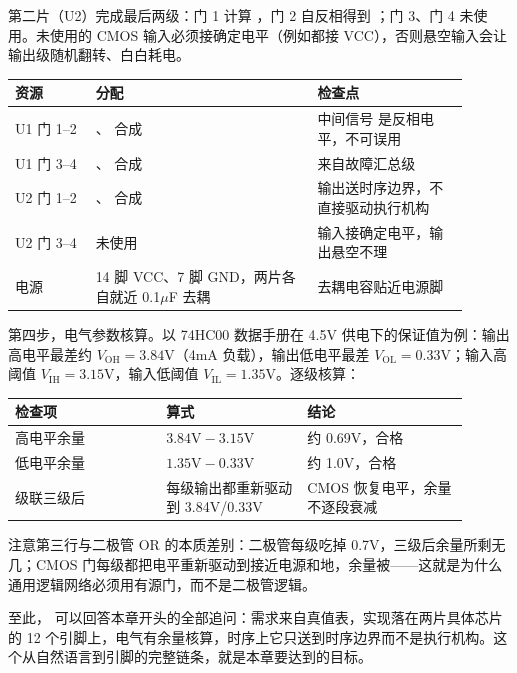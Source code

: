 第二片（U2）完成最后两级：门 1 计算 ，门 2 自反相得到 ；门 3、门 4 未使用。未使用的 CMOS 输入必须接确定电平（例如都接 VCC），否则悬空输入会让输出级随机翻转、白白耗电。

\begin{longtable}{L{0.16\linewidth}L{0.44\linewidth}L{0.3\linewidth}}
\toprule
资源 & 分配 & 检查点 \\
\midrule
U1 门 1–2 & 、 合成  & 中间信号  是反相电平，不可误用 \\
U1 门 3–4 & 、 合成  &  来自故障汇总级 \\
U2 门 1–2 & 、 合成  & 输出送时序边界，不直接驱动执行机构 \\
U2 门 3–4 & 未使用 & 输入接确定电平，输出悬空不理 \\
电源 & 14 脚 VCC、7 脚 GND，两片各自就近 0.1$\mu$F 去耦 & 去耦电容贴近电源脚 \\
\bottomrule
\end{longtable}

第四步，电气参数核算。以 74HC00 数据手册在 4.5V 供电下的保证值为例：输出高电平最差约 $V_\mathrm{OH}=3.84$V（4mA 负载），输出低电平最差 $V_\mathrm{OL}=0.33$V；输入高阈值 $V_\mathrm{IH}=3.15$V，输入低阈值 $V_\mathrm{IL}=1.35$V。逐级核算：

\begin{longtable}{L{0.3\linewidth}L{0.28\linewidth}L{0.32\linewidth}}
\toprule
检查项 & 算式 & 结论 \\
\midrule
高电平余量 & $3.84\mathrm{V} - 3.15\mathrm{V}$ & 约 0.69V，合格 \\
低电平余量 & $1.35\mathrm{V} - 0.33\mathrm{V}$ & 约 1.0V，合格 \\
级联三级后 & 每级输出都重新驱动到 3.84V/0.33V & CMOS 恢复电平，余量不逐段衰减 \\
\bottomrule
\end{longtable}

注意第三行与二极管 OR 的本质差别：二极管每级吃掉 0.7V，三级后余量所剩无几；CMOS 门每级都把电平重新驱动到接近电源和地，余量被——这就是为什么通用逻辑网络必须用有源门，而不是二极管逻辑。

至此， 可以回答本章开头的全部追问：需求来自真值表，实现落在两片具体芯片的 12 个引脚上，电气有余量核算，时序上它只送到时序边界而不是执行机构。这个从自然语言到引脚的完整链条，就是本章要达到的目标。

